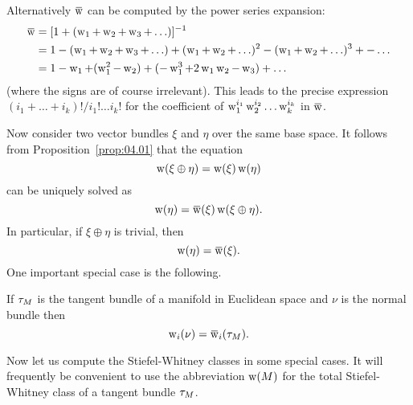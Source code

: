 \documentclass[../main]{subfiles}
\begin{document}
Alternatively $\xoverline{\sw}$ can be computed by the power series expansion:
\begin{align*}
\xoverline{\sw} &=[1+(\sw_{1}+\sw_{2}+\sw_{3}+\ldots)]^{-1} \\
&=1-(\sw_{1}+\sw_{2}+\sw_{3}+\ldots)+(\sw_{1}+\sw_{2}+\ldots)^{2}-(\sw_{1}+\sw_{2}+\ldots)^{3}+-\ldots \\
&=1-\sw_{1}+(\sw_{1}^{2}-\sw_{2})+(-\sw_{1}^{3}+2\sw_{1}\sw_{2}-\sw_3)+\ldots
\end{align*}
(where the signs are of course irrelevant). This leads to the precise expression $(i_{1}+\ldots+i_{k}) ! / i_{1} ! \ldots i_{k} !$ for the coefficient of $\operatorname{w}_{1}^{i_1}\operatorname{w}_{2}^{i_{2}} \ldots \operatorname{w}_{k}^{i_k}$ in $\xoverline{\sw}$.

Now consider two vector bundles $\xi$ and $\eta$ over the same base space. It follows from Proposition~\ref{prop:04.01} that the equation
\[
\operatorname{w}(\xi \oplus \eta)=\operatorname{w}(\xi) \operatorname{w}(\eta)
\]
can be uniquely solved as
\[
\sw(\eta)=\xoverline{\sw}(\xi) \sw(\xi \oplus \eta) .
\]
In particular, if $\xi \oplus \eta$ is trivial, then
\[
\sw(\eta)=\xoverline{\sw}(\xi).
\]
One important special case is the following.

\begin{lemma}
\label{lem:04.02}
If $\tau_{M}$ is the tangent bundle
 of a manifold in Euclidean space and $\nu$ is the normal bundle then
\[
\sw_{i}(\nu)=\xoverline{\sw}_{i}(\tangentBundle{M}).
\]
\end{lemma}

Now let us compute the Stiefel-Whitney classes in some special cases. It will frequently be convenient to use the abbreviation $\operatorname{w}(M)$ for the total Stiefel\nobreakdash-Whitney class of a tangent bundle $\tau_{M}$.
\end{document}
